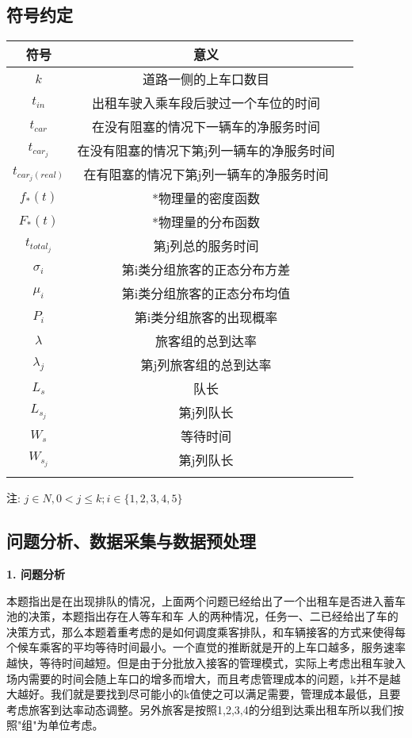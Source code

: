 \documentclass[UTF8]{ctexart}
\begin{document}
	\subsection{符号约定}
		\begin{tabular}{ccc}
			\hline
			符号 & 意义 \\
			\hline
			$k$ & 道路一侧的上车口数目 \\
			$t_{in}$ & 出租车驶入乘车段后驶过一个车位的时间 \\ 
			$t_{car}$ & 在没有阻塞的情况下一辆车的净服务时间 \\
			$t_{car_j}$ & 在没有阻塞的情况下第j列一辆车的净服务时间 \\
			$t_{car_j(real)}$ & 在有阻塞的情况下第j列一辆车的净服务时间 \\
			$f_{*}(t)$ & *物理量的密度函数 \\
			$F_{*}(t)$ & *物理量的分布函数 \\
			$t_{total_j}$ & 第j列总的服务时间 \\
			$\sigma_i$ & 第i类分组旅客的正态分布方差 \\
			$\mu_i$ & 第i类分组旅客的正态分布均值 \\
			$P_i$ &  第i类分组旅客的出现概率 \\
			$\lambda$ & 旅客组的总到达率 \\
			$\lambda_j$ & 第j列旅客组的总到达率 \\
			$L_s$ &  队长 \\
			$L_{s_j}$ & 第j列队长 \\
			$W_s$ &  等待时间 \\
			$W_{s_j}$ & 第j列队长 \\
			\hline	
			\label{tab:test1}
		\end{tabular}

		注: $j \in {N}, 0<j \leq k; i \in \{1,2,3,4,5\}$
	
	\subsection{问题分析、数据采集与数据预处理}
	\textbf{1. 问题分析}
	
	本题指出是在出现排队的情况，上面两个问题已经给出了一个出租车是否进入蓄车池的决策，本题指出存在人等车和车 人的两种情况，任务一、二已经给出了车的决策方式，那么本题着重考虑的是如何调度乘客排队，和车辆接客的方式来使得每个候车乘客的平均等待时间最小。一个直觉的推断就是开的上车口越多，服务速率越快，等待时间越短。但是由于分批放入接客的管理模式，实际上考虑出租车驶入场内需要的时间会随上车口的增多而增大，而且考虑管理成本的问题，k并不是越大越好。我们就是要找到尽可能小的k值使之可以满足需要，管理成本最低，且要考虑旅客到达率动态调整。另外旅客是按照1,2,3,4的分组到达乘出租车所以我们按照"组"为单位考虑。
	
\end{document}
